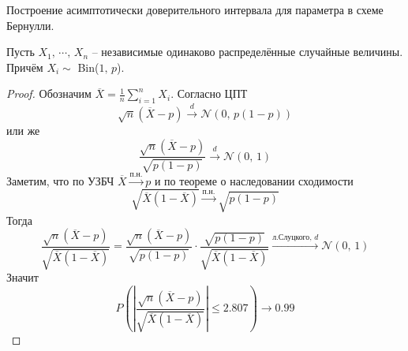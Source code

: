 \begin{example}
	Построение асимптотически доверительного интервала для параметра в схеме Бернулли.

	Пусть $X_1,\,\cdots,\,X_n$ -- независимые одинаково распределённые случайные величины. Причём $X_i \sim$ Bin($1,\,p$).
\end{example}

\begin{proof}
	Обозначим $\overline{X} = \frac{1}{n}\sum_{i = 1}^n X_i$. Согласно ЦПТ
	\[\sqrt{n}(\overline{X} - p) \stackrel{d}{\to} \mathcal{N}(0,\, p(1 - p))\]
	или же
	\[\frac{\sqrt{n}(\overline{X} - p)}{\sqrt{p(1 - p)}} \stackrel{d}{\to} \mathcal{N}(0,\,1)\]
	Заметим, что по УЗБЧ $\overline{X} \stackrel{\text{п.н.}}{\to} p$ и по теореме о наследовании сходимости
	\[\sqrt{\overline{X}(1 - \overline{X})} \stackrel{\text{п.н.}}{\to} \sqrt{p(1 - p)}\]
	Тогда
	\[\frac{\sqrt{n}(\overline{X} - p)}{\sqrt{\overline{X}(1 - \overline{X})}} = \frac{\sqrt{n}(\overline{X} - p)}{\sqrt{p(1 - p)}}\cdot\frac{\sqrt{p(1 - p)}}{\sqrt{\overline{X}(1 - \overline{X})}} \stackrel{\text{л.Слуцкого},\, d}{\to}\mathcal{N}(0,\,1)\]
	Значит
	\[P\left(\left|\frac{\sqrt{n}(\overline{X} - p)}{\sqrt{\overline{X}(1 - \overline{X})}}\right| \leq 2.807\right) \to 0.99\]
\end{proof}
